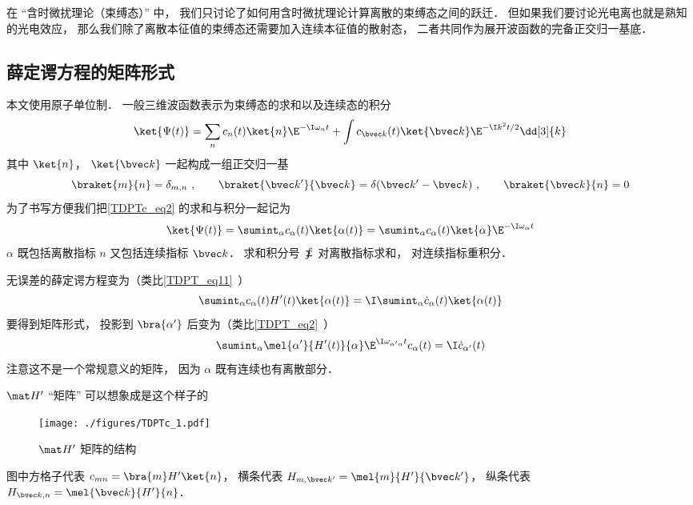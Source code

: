 

在 “含时微扰理论（束缚态）” 中， 我们只讨论了如何用含时微扰理论计算离散的束缚态之间的跃迁． 但如果我们要讨论光电离也就是熟知的光电效应， 那么我们除了离散本征值的束缚态还需要加入连续本征值的散射态， 二者共同作为展开波函数的完备正交归一基底．

\subsection{薛定谔方程的矩阵形式}
本文使用原子单位制． 一般三维波函数表示为束缚态的求和以及连续态的积分
\begin{equation}\label{TDPTc_eq2}
\ket{\Psi(t)} = \sum_n c_n(t)\ket{n}\E^{-\I\omega_n t} + \int c_{\bvec k}(t)\ket{\bvec k}\E^{-\I k^2 t/2} \dd[3]{k}
\end{equation}
其中 $\ket{n}$， $\ket{\bvec k}$ 一起构成一组正交归一基
\begin{equation}
\braket{m}{n} = \delta_{m,n}~, \qquad
\braket{\bvec k'}{\bvec k} = \delta(\bvec k' - \bvec k)~, \qquad
\braket{\bvec k}{n} = 0
\end{equation}
为了书写方便我们把\autoref{TDPTc_eq2} 的求和与积分一起记为
\begin{equation}
\ket{\Psi(t)} = \sumint_\alpha c_\alpha(t) \ket{\alpha(t)} = \sumint_\alpha c_\alpha(t) \ket{\alpha}\E^{-\I\omega_\alpha t} 
\end{equation}
$\alpha$ 既包括离散指标 $n$ 又包括连续指标 $\bvec k$． 求和积分号 $\sumint$ 对离散指标求和， 对连续指标重积分．

无误差的薛定谔方程变为（类比\autoref{TDPT_eq11}~）
\begin{equation}
\sumint_\alpha c_\alpha(t) H'(t) \ket{\alpha(t)} = \I \sumint_\alpha \dot c_\alpha(t) \ket{\alpha(t)}
\end{equation}
要得到矩阵形式， 投影到 $\bra{\alpha'}$ 后变为（类比\autoref{TDPT_eq2}~）
\begin{equation}
\sumint_\alpha \mel{\alpha'}{H'(t)}{\alpha} \E^{\I \omega_{\alpha'\alpha} t} c_\alpha(t)
= \I \dot c_{\alpha'} (t)
\end{equation}
注意这不是一个常规意义的矩阵， 因为 $\alpha$ 既有连续也有离散部分．

$\mat H'$  “矩阵” 可以想象成是这个样子的
\begin{figure}[ht]
\centering
\texttt{[image: ./figures/TDPTc\_1.pdf]}
\caption{$\mat H'$ 矩阵的结构} 
\end{figure}
图中方格子代表 $c_{mn} = \bra{m} H' \ket{n}$， 横条代表 $H_{m,\bvec k'} = \mel{m}{H'}{\bvec k'}$，  纵条代表 $H_{\bvec k, n} = \mel{\bvec k}{H'}{n}$． 

